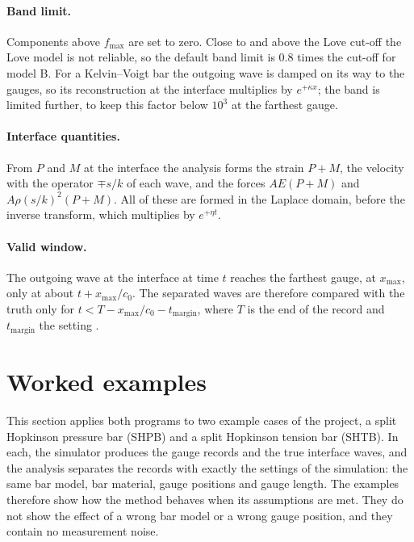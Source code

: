 \documentclass[11pt,a4paper,numbers=noenddot,abstract=true]{scrartcl}
\newcommand{\code}[1]{\texttt{\detokenize{#1}}}
\begin{document}
\paragraph{Band limit.} Components above $f_\mathrm{max}$ are set to zero. Close to and above the Love cut-off the
Love model is not reliable, so the default band limit is 0.8 times the cut-off for model B. For a Kelvin--Voigt
bar the outgoing wave is damped on its way to the gauges, so its reconstruction at the interface multiplies by
$e^{+\kappa x}$; the band is limited further, to keep this factor below $10^3$ at the farthest gauge.

\paragraph{Interface quantities.} From $P$ and $M$ at the interface the analysis forms the strain $P + M$, the
velocity with the operator $\mp s / k$ of each wave, and the forces $A E (P + M)$ and $A\rho(s / k)^2 (P + M)$. All
of these are formed in the Laplace domain, before the inverse transform, which multiplies by $e^{+\eta t}$.

\paragraph{Valid window.} The outgoing wave at the interface at time $t$ reaches the farthest gauge, at
$x_\mathrm{max}$, only at about $t + x_\mathrm{max} / c_0$. The separated waves are therefore compared with the
truth only for $t < T - x_\mathrm{max} / c_0 - t_\mathrm{margin}$, where $T$ is the end of the record and
$t_\mathrm{margin}$ the setting \code{valid_margin}.

\section{Worked examples}
\label{sec:examples}

This section applies both programs to two example cases of the project, a split Hopkinson pressure bar (SHPB) and
a split Hopkinson tension bar (SHTB). In each, the simulator produces the gauge records and the true interface
waves, and the analysis separates the records with exactly the settings of the simulation: the same bar model, bar
material, gauge positions and gauge length. The examples therefore show how the method behaves when its
assumptions are met. They do not show the effect of a wrong bar model or a wrong gauge position, and they contain
no measurement noise.
\end{document}
